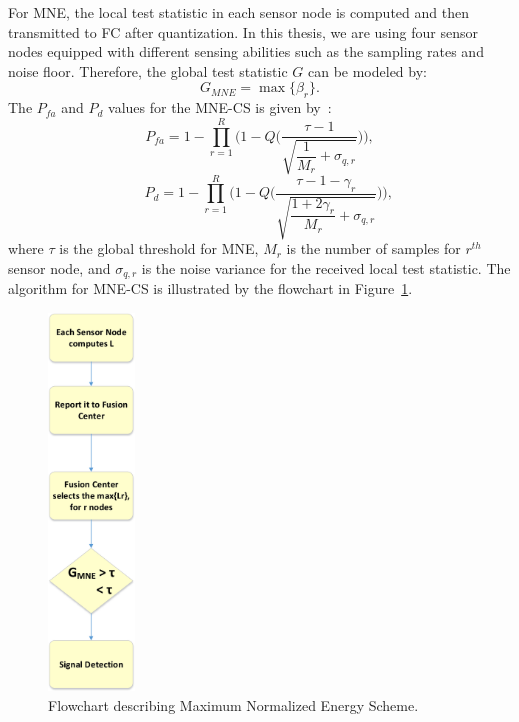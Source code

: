 For MNE, the local test statistic in each sensor node is computed and then transmitted to FC after quantization. In this thesis, we are using four sensor nodes equipped with different sensing abilities such as the sampling rates and noise floor. Therefore, the global test statistic $G$ can be modeled by:
\begin{equation}
\label{eq:8}
G_{MNE} = \max\{\beta_r\}.
\end{equation}
The $P_{fa}$ and $P_d$ values for the MNE-CS is given by~\cite{inhtn12}:
\begin{equation}
\label{eq:9}
P_{fa} = 1-\prod_{r=1}^R\Bigg(1-Q\Bigg(\dfrac{\tau-1}{\sqrt{\dfrac{1}{M_r}+\sigma_{q,r}}}\Bigg)\Bigg),
\end{equation}
\begin{equation}
\label{eq:10}
~~~~~~P_d = 1-\prod_{r=1}^R\Bigg(1-Q\Bigg(\dfrac{\tau-1-\gamma_r}{\sqrt{\dfrac{1+2\gamma_r}{M_r}+\sigma_{q,r}}}\Bigg)\Bigg),
\end{equation}
where $\tau$ is the global threshold for MNE, $M_r$ is the number of samples for $r^{th}$ sensor node, and $\sigma_{q,r}$ is the noise variance for the received local test statistic. The algorithm for MNE-CS is illustrated by the flowchart in Figure~\ref{mnescheme}.

\begin{figure}[ht!]
	\centering
	\includegraphics[width=\textwidth,height=10cm,keepaspectratio]{images/Gill/figs/mnescheme.eps}
\caption{Flowchart describing Maximum Normalized Energy Scheme.} 
\label{mnescheme}      
\end{figure}

